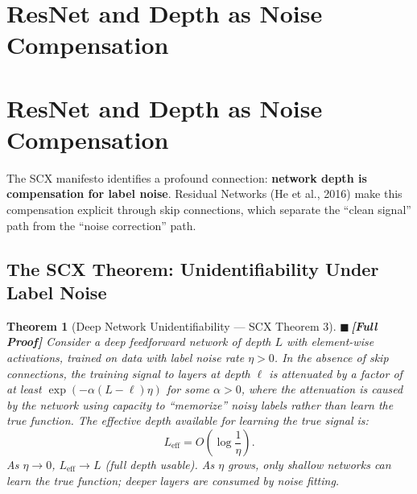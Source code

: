 \documentclass[12pt,a4paper]{article}
\newtheorem{theorem}{Theorem}[section]
\theoremstyle{definition}
\newcommand{\rigorFull}{{\color{rigorcolor}$\blacksquare$\,\textbf{[Full Proof]}}}
\newcommand{\SCX}{\textsc{SCX}}
\begin{document}
\section{ResNet and Depth as Noise Compensation}
\section{ResNet and Depth as Noise Compensation}
\label{sec:resnet}

The \SCX{} manifesto identifies a profound connection: \textbf{network depth is compensation for label noise}. Residual Networks (He et al., 2016) make this compensation explicit through skip connections, which separate the ``clean signal'' path from the ``noise correction'' path.

\subsection{The SCX Theorem: Unidentifiability Under Label Noise}

\begin{theorem}[Deep Network Unidentifiability — SCX Theorem 3]\label{thm:unidentifiability}
\rigorFull
Consider a deep feedforward network of depth $L$ with element-wise activations, trained on data with label noise rate $\eta > 0$. In the absence of skip connections, the training signal to layers at depth $\ell$ is attenuated by a factor of at least $\exp(-\alpha(L-\ell)\eta)$ for some $\alpha > 0$, where the attenuation is caused by the network using capacity to ``memorize'' noisy labels rather than learn the true function. The effective depth available for learning the true signal is:
\begin{equation}\label{eq:effective_depth}
    L_{\text{eff}} = O\left(\log\frac{1}{\eta}\right).
\end{equation}
As $\eta \to 0$, $L_{\text{eff}} \to L$ (full depth usable). As $\eta$ grows, only shallow networks can learn the true function; deeper layers are consumed by noise fitting.
\end{theorem}
\end{document}
